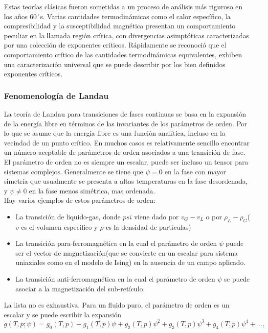 \documentclass[a4paper]{article}
\begin{document}
Estas teorías clásicas fueron sometidas a un proceso de análisis más riguroso en los años 60´s. Varias cantidades termodinámicas como el calor específico, la compresibilidad y la susceptibilidad magnética presentan un comportamiento peculiar en la llamada región crítica, con divergencias asimptóticas caracterizadas por una colección de exponentes críticos. Rápidamente se reconoció que el comportamiento crítico de las cantidades termodinámicas equivalentes, exhiben una caracterización universal que se puede describir por los bien definidos exponentes críticos.  \\
\subsubsection{Fenomenología de Landau}
La teoría de Landau para transiciones de fases continuas se basa en la expansión de la energía libre en términos de las invariantes de los parámetros de orden. Por lo que se asume que la energía libre es una función analítica, incluso en la vecindad de un punto crítico. En muchos casos es relativamente sencillo  encontrar un número aceptable  de parámetros de orden asociados a una transición de fase. El parámetro de orden no es siempre un escalar, puede ser incluso un tensor para sistemas complejos. Generalmente se tiene que $\psi=0$ en la fase con mayor simetría que usualmente se presenta a altas temperaturas en la fase desordenada, y $\psi\neq0$ en la fase menos simétrica, mas ordenada.\\
Hay varios ejemplos de estos parámetros de orden:
\begin{itemize}
\item La transición de liquido-gas, donde $psi$ viene dado por $v_G-v_L$ o por $\rho_L-\rho_G$($v$ es el volumen especifico y $\rho$ es la densidad de partículas)
\item La transición para-ferromagnética en la cual el parámetro de orden $\psi$ puede ser el vector de magnetización(que se convierte en un escalar para sistema uniaxiales como en el modelo de Ising) en la ausencia de un campo aplicado.
\item La transición anti-ferromagnética  en la cual el parámetro de orden $\psi$ se puede asociar a la magnetización del sub-retículo.
\end{itemize}
La lista no es exhaustiva. Para un fluido puro, el parámetro de orden es un escalar y se puede escribir la expansión
\begin{equation}
g(T,p;\psi)=g_0(T,p)+g_1(T,p)\psi+g_2(T,p)\psi^2+g_3(T,p)\psi^3+g_4(T,p)\psi^4+\hdots,
\end{equation}
\end{document}

